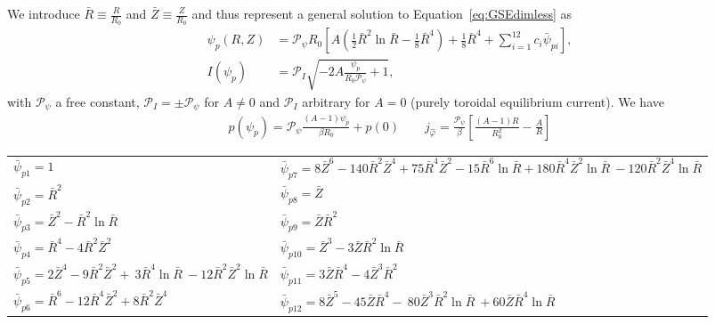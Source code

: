 We introduce \(\bar{R} \equiv \frac{R}{R_0}\) and \(\bar{Z} \equiv\frac{Z}{R_0}\)
and thus represent a general solution to Equation~\eqref{eq:GSEdimless} as~\cite{Cerfon2010}
\begin{subequations}
\label{eq:solovev}
\begin{align}
 \psi_p (R,Z) &= \mathcal P_{\psi} R_0 \left[ A\left( \frac{1}{2} \bar{R}^2 \ln{\bar{R}}
   - \frac{1}{8}\bar{R}^4\right)+ \frac{1}{8}\bar{R}^4
   + \sum_{i=1}^{12} c_{i}  \bar{\psi}_{pi}\right],\\
   I(\psi_p) &= \mathcal P_I\sqrt{ - 2A\frac{\psi_p}{R_0\mathcal P_{\psi}} +1},
\end{align}
\end{subequations}
with $\mathcal P_\psi$ a free constant, $\mathcal P_I = \pm \mathcal P_\psi$ for $A\neq 0$ and $\mathcal P_I$ arbitrary for $A=0$ (purely toroidal equilibrium current).
We have
\begin{align}
    p(\psi_p) = \mathcal P_\psi \frac{( A-1)\psi_p}{\beta R_0 } + p(0) \qquad
    j_{\hat\varphi} = \frac{\mathcal P_\psi}{\beta } \left[\frac{(A-1)R}{R_0^2} - \frac{A}{R}\right]
\end{align}
\begin{longtable}{>{\RaggedRight}p{7cm}>{\RaggedRight}p{7cm}}
\toprule
  $\bar{\psi}_{p1}=1$
  & $\bar{\psi}_{p7}=8\bar{Z}^6 -140 \bar{R}^2 \bar{Z}^4
                      + 75 \bar{R}^4 \bar{Z}^2 - 15\bar{R}^6\ln{\bar{R}}+ 180 \bar{R}^4 \bar{Z}^2 \ln{\bar{R}} \
                       -120 \bar{R}^2 \bar{Z}^4 \ln{\bar{R}}$\\
%
  $\bar{\psi}_{p2}=\bar{R}^2$ &
  $\bar{\psi}_{p8}=\bar{Z}$ \\
%
  $\bar{\psi}_{p3}=\bar{Z}^2 - \bar{R}^2 \ln{\bar{R}}$ &
  $\bar{\psi}_{p9}=\bar{Z}  \bar{R}^2$\\
%
  $\bar{\psi}_{p4}=\bar{R}^4 -4\bar{R}^2\bar{Z}^2$ &
  $\bar{\psi}_{p10}=\bar{Z}^3 - 3 \bar{Z} \bar{R}^2 \ln{\bar{R}}$\\
  $\bar{\psi}_{p5}=2\bar{Z}^4 - 9 \bar{R}^2\bar{Z}^2 + \
                     3 \bar{R}^4 \ln{\bar{R}} \
                    -12  \bar{R}^2\bar{Z}^2 \ln{\bar{R}}$
  &
$\bar{\psi}_{p11}=3 \bar{Z}\bar{R}^4 - 4\bar{Z}^3\bar{R}^2$\\
%
  $\bar{\psi}_{p6}=\bar{R}^6 -12 \bar{R}^4 \bar{Z}^2
                     + 8  \bar{R}^2 \bar{Z}^4$ &
  $\bar{\psi}_{p12}= 8 \bar{Z}^5 -45 \bar{Z} \bar{R}^4 - \
                       80 \bar{Z}^3 \bar{R}^2\ln{\bar{R}} \
                       +60 \bar{Z} \bar{R}^4\ln{\bar{R}}$ \\
\bottomrule
\end{longtable}

